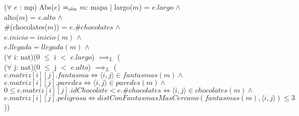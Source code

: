 \documentclass{book}
\begin{document}
        ($\forall$ $e$ : mp) Abs($e$) $=_{\mathrm{obs}}$ $m$: mapa | largo($m$) = $e.largo$ $\wedge$ \\
            \text{}\qquad alto($m$) = $e.alto$ $\wedge$ \\
            \text{}\qquad \#(chocolates($m$)) = $e.\#chocolates$ $\wedge$ \\
            \text{}\qquad $e.inicio = inicio(m)$ $\wedge$ \\
            \text{}\qquad $e.llegada = llegada(m)$ $\wedge$ \\
            \text{}\qquad ($\forall$ i: nat)(0 $\leq$ i $<$ $e.largo$) $\implies_L$ ( \\
                \text{}\qquad\quad ($\forall$ j: nat)(0 $\leq$ j $<$ $e.alto$) $\implies_L$ ( \\
                \text{}\qquad\quad $e.matriz[i][j].fantasma \iff \langle i,j \rangle \in fantasmas(m) \wedge $ \\
                \text{}\qquad\quad $e.matriz[i][j].paredes \iff \langle i,j \rangle \in paredes(m) \wedge $ \\
                \text{}\qquad\quad $0 \leq e.matriz[i][j].idChocolate < e.\#chocolates \iff \langle i,j \rangle \in chocolates(m) \wedge $ \\
                \text{}\qquad\quad $e.matriz[i][j].peligrosa \iff distConFantasmasMasCercano(fantasmas(m), \langle i,j \rangle) \leq 3$))

    \newpage
\end{document}
